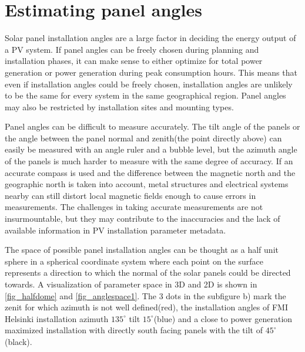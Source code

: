 \chapter{Estimating panel angles}
Solar panel installation angles are a large factor in deciding the energy output of a PV system. If panel angles can be freely chosen during planning and installation phases, it can make sense to either optimize for total power generation or power generation during peak consumption hours. This means that even if installation angles could be freely chosen, installation angles are unlikely to be the same for every system in the same geographical region. Panel angles may also be restricted by installation sites and mounting types.




Panel angles can be difficult to measure accurately. The tilt angle of the panels or the angle between the panel normal and zenith(the point directly above) can easily be measured with an angle ruler and a bubble level, but the azimuth angle of the panels is much harder to measure with the same degree of accuracy. If an accurate compass is used and the difference between the magnetic north and the geographic north is taken into account, metal structures and electrical systems nearby can still distort local magnetic fields enough to cause errors in measurements. The challenges in taking accurate measurements are not insurmountable, but they may contribute to the inaccuracies and the lack of available information in PV installation parameter metadata. 

The space of possible panel installation angles can be thought as a half unit sphere in a spherical coordinate system where each point on the surface represents a direction to which the normal of the solar panels could be directed towards. A visualization of parameter space in 3D and 2D is shown in \ref{fig_halfdome} and \ref{fig_anglespace1}. The 3 dots in the subfigure b) mark the zenit for which azimuth is not well defined(red), the installation angles of FMI Helsinki installation azimuth $135^\circ$ tilt $15^\circ$(blue) and a close to power generation maximized installation with directly south facing panels with the tilt of $45^\circ$(black).


